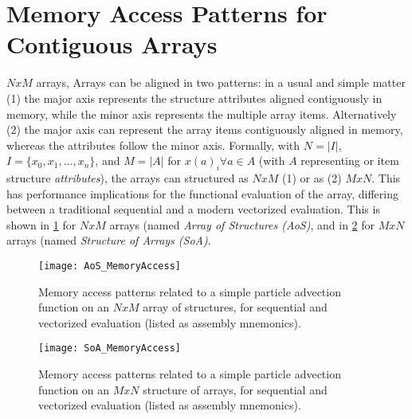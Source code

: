 \documentclass[supplement,onefignum,onetabnum]{siamart190516} %
\begin{document}
\maketitle


\section{Memory Access Patterns for Contiguous Arrays}
\label{sec:supplemental:memaccess}

$N x M$ arrays,  Arrays can be aligned in two patterns: in a usual and simple matter (1) the major axis represents the structure attributes aligned contiguously in memory, while the minor axis represents the multiple array items. Alternatively (2) the major axis can represent the array items contiguously aligned in memory, whereas the attributes follow the minor axis. Formally, with $N = |I|$, $I = \{x_{0}, x_{1}, ..., x_{n}\}$, and $M = |A|$ for $x(a)_{i} \forall a \in A$ (with $A$ representing or item structure \textit{attributes}), the arrays can structured as $N x M$ (1) or as (2) $M x N$. This has performance implications for the functional evaluation of the array, differing between a traditional sequential and a modern vectorized evaluation. This is shown in \cref{fig:appendix:memaccess:aos} for $N x M$ arrays (named \textit{Array of Structures (AoS)}, and in \cref{fig:appendix:memaccess:soa} for $M x N$ arrays (named \textit{Structure of Arrays (SoA)}.

\begin{figure}[htbp]
  \centering
  \texttt{[image: AoS\_MemoryAccess]}
  \caption{Memory access patterns related to a simple particle advection function on an $N x M$ array of structures, for sequential and vectorized evaluation (listed as assembly mnemonics).}
  \label{fig:appendix:memaccess:aos}
\end{figure}

\begin{figure}[htbp]
  \centering
  \texttt{[image: SoA\_MemoryAccess]}
  \caption{Memory access patterns related to a simple particle advection function on an $M x N$ structure of arrays, for sequential and vectorized evaluation (listed as assembly mnemonics).}
  \label{fig:appendix:memaccess:soa}
\end{figure}
\end{document}
